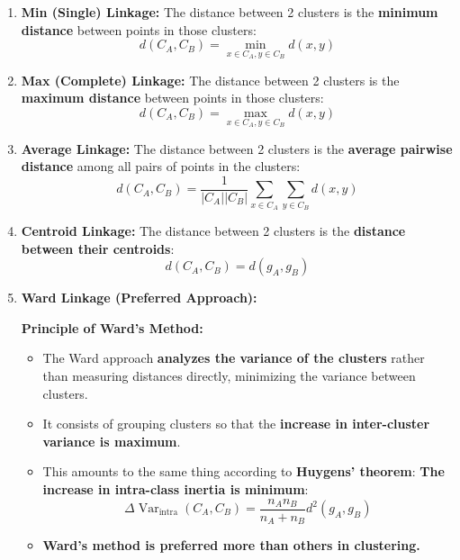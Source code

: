 \documentclass[10pt,a4paper]{article}
\begin{document}
\begin{enumerate}[leftmargin=14pt, itemsep=2pt, topsep=1.5pt, parsep=0pt]
    \item \textbf{Min (Single) Linkage:}
    The distance between 2 clusters is the \textbf{minimum distance} between points in those clusters:
    \[
    d(C_A, C_B) = \min_{x \in C_A, y \in C_B} d(x, y)
    \]

    \item \textbf{Max (Complete) Linkage:}
    The distance between 2 clusters is the \textbf{maximum distance} between points in those clusters:
    \[
    d(C_A, C_B) = \max_{x \in C_A, y \in C_B} d(x, y)
    \]

    \item \textbf{Average Linkage:}
    The distance between 2 clusters is the \textbf{average pairwise distance} among all pairs of points in the clusters:
    \[
    d(C_A, C_B) = \frac{1}{|C_A| |C_B|} \sum_{x \in C_A} \sum_{y \in C_B} d(x, y)
    \]

    \item \textbf{Centroid Linkage:}
    The distance between 2 clusters is the \textbf{distance between their centroids}:
    \[
    d(C_A, C_B) = d(g_A, g_B)
    \]

    \item \textbf{Ward Linkage (Preferred Approach):}
    \begin{tcolorbox}[
        colframe=accentred,
        colback=white,
        arc=1.5mm,
        boxrule=0.5pt,
        left=6pt, right=6pt, top=2.5pt, bottom=2.5pt
    ]
    \textbf{Principle of Ward's Method:}
    \begin{itemize}[leftmargin=10pt, itemsep=1.5pt, topsep=1pt]
        \item The Ward approach \textbf{analyzes the variance of the clusters} rather than measuring distances directly, minimizing the variance between clusters.
        \item It consists of grouping clusters so that the \textbf{increase in inter-cluster variance is maximum}.
        \item This amounts to the same thing according to \textbf{Huygens' theorem}: \textbf{The increase in intra-class inertia is minimum}:
        \[
        \Delta \operatorname{Var}_{\text{intra}}(C_A, C_B) = \frac{n_A n_B}{n_A + n_B} d^2(g_A, g_B)
        \]
        \item \textbf{Ward's method is preferred more than others in clustering.}
    \end{itemize}
    \end{tcolorbox}
\end{enumerate}
\end{document}
